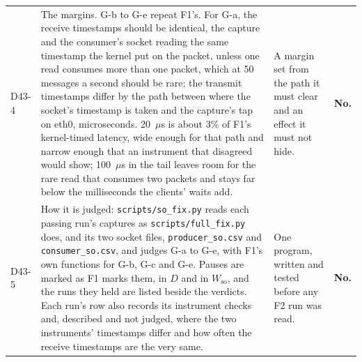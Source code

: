 \documentclass[11pt]{article}
\begin{document}
{\begin{longtable}{@{}p{1.1cm} >{\raggedright\arraybackslash}p{6.1cm} >{\raggedright\arraybackslash}p{6.0cm} >{\raggedright\arraybackslash}p{2.2cm}@{}}
D43-4 & The margins. G-b to G-e repeat F1's. For G-a, the receive timestamps should be identical, the capture and the consumer's socket reading the same timestamp the kernel put on the packet, unless one read consumes more than one packet, which at 50 messages a second should be rare; the transmit timestamps differ by the path between where the socket's timestamp is taken and the capture's tap on eth0, microseconds. 20~$\mu$s is about 3\% of F1's kernel-timed latency, wide enough for that path and narrow enough that an instrument that disagreed would show; 100~$\mu$s in the tail leaves room for the rare read that consumes two packets and stays far below the milliseconds the clients' waits add. & A margin set from the path it must clear and an effect it must not hide. & \textbf{No.} \\
D43-5 & How it is judged: \texttt{scripts/so\_fix.py} reads each passing run's captures as \texttt{scripts/full\_fix.py} does, and its two socket files, \texttt{producer\_so.csv} and \texttt{consumer\_so.csv}, and judges G-a to G-e, with F1's own functions for G-b, G-c and G-e. Pauses are marked as F1 marks them, in $D$ and in $W_{\mathrm{so}}$, and the runs they held are listed beside the verdicts. Each run's row also records its instrument checks and, described and not judged, where the two instruments' timestamps differ and how often the receive timestamps are the very same. & One program, written and tested before any F2 run was read. & \textbf{No.} \\

\end{longtable}}
\end{document}
